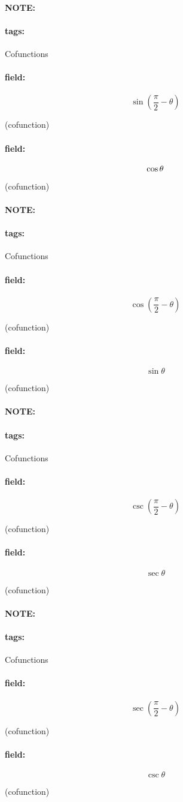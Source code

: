 \documentclass[12pt]{article}
\newenvironment{note}{\paragraph{NOTE:}}{}
\newenvironment{field}{\paragraph{field:}}{}
\newcommand*{\tags}[1]{\paragraph{tags: }#1}
\begin{document}
\begin{note}
    \tags{Cofunctions}
    \begin{field}
    \[  
          \sin(\frac{\pi}{2} - \theta) 
    \] 
    \begin{center}
    (cofunction)
    \end{center}
    \end{field}
    \begin{field}
    \[
        \cos \theta\\
    \] 
    \begin{center}
    (cofunction)
    \end{center}
    \end{field}
\end{note}

\begin{note}
    \tags{Cofunctions}
    \begin{field}
    \[  
        \cos(\frac{\pi}{2} - \theta)
    \] 
    \begin{center}
        (cofunction)
    \end{center}
    \end{field}
    \begin{field}
    \[
        \sin \theta
    \] 
    \begin{center}
        (cofunction)
    \end{center}
    \end{field}
\end{note}

\begin{note}
    \tags{Cofunctions}
    \begin{field}
    \[  
        \csc(\frac{\pi}{2} - \theta)
    \] 
    \begin{center}
    (cofunction)
    \end{center}
    \end{field}
    \begin{field}
    \[
        \sec \theta
    \]
    \begin{center}
    (cofunction)
    \end{center}
    \end{field}
\end{note}

\begin{note}
    \tags{Cofunctions}
    \begin{field}
    \[  
        \sec(\frac{\pi}{2} - \theta)
    \] 
    \begin{center}
    (cofunction)
\end{center}
    \end{field}
    \begin{field}
    \[
        \csc \theta
    \] 
    \begin{center}
    (cofunction)
\end{center}
    \end{field}
\end{note}
\end{document}
